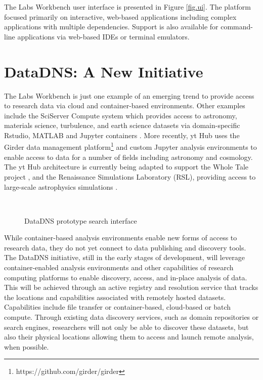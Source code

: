 \documentclass{sig-alternate}
\begin{document}
The Labs Workbench user interface is presented in Figure \ref{fig.ui}.  The platform focused primarily on interactive, web-based applications including complex applications with multiple dependencies. Support is also available for command-line applications via web-based IDEs or terminal emulators.  

\section{DataDNS: A New Initiative}

The Labs Workbench is just one example of an emerging trend to provide access to research data via cloud and container-based environments.  Other examples include the SciServer Compute system which provides access to astronomy, materials science, turbulence, and earth science datasets via domain-specific Rstudio, MATLAB and Jupyter containers \cite{Medvedev:2016:SCB:2949689.2949700}.  More recently, yt Hub \cite{zuhone2016galaxy} uses the Girder data management platform\footnote{https://github.com/girder/girder} and custom Jupyter analysis environments to enable access to data for a number of fields including astronomy and cosmology. The yt Hub architecture is currently being adapted to support the Whole Tale project \cite{ludaescher2016capturing}, and the Renaissance Simulations Laboratory (RSL), providing access to large-scale astrophysics simulations \cite{2041-8205-807-1-L12}.

\begin{figure}[!ht]
\\
\caption{DataDNS prototype search interface}
\label{fig.datadns}
\end{figure}

While container-based analysis environments enable new forms of access to research data, they do not yet connect to data publishing and discovery tools.  The DataDNS initiative, still in the early stages of development, will leverage container-enabled analysis environments and other capabilities of research computing platforms to enable discovery, access, and in-place analysis of data.  This will be achieved through an active registry and resolution service that tracks the locations and capabilities associated with remotely hosted datasets. Capabilities include file transfer or container-based, cloud-based or batch compute. Through existing data discovery services, such as domain repositories or search engines, researchers will not only be able to discover these datasets, but also their physical locations allowing them to access and launch remote analysis, when possible.   
\end{document}
